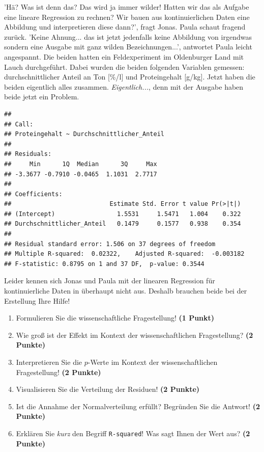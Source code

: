 \documentclass[a4paper, 9pt]{scrartcl}\usepackage[]{graphicx}\usepackage[]{xcolor}
\makeatletter
\newenvironment{kframe}{%
 \def\at@end@of@kframe{}%
 \ifinner\ifhmode%
  \def\at@end@of@kframe{\end{minipage}}%
  \begin{minipage}{\columnwidth}%
 \fi\fi%
 \def\FrameCommand##1{\hskip\@totalleftmargin \hskip-\fboxsep
 \colorbox{shadecolor}{##1}\hskip-\fboxsep
     \hskip-\linewidth \hskip-\@totalleftmargin \hskip\columnwidth}%
 \MakeFramed {\advance\hsize-\width
   \@totalleftmargin\z@ \linewidth\hsize
   \@setminipage}}%
 {\par\unskip\endMakeFramed%
 \at@end@of@kframe}
\newenvironment{knitrout}{}{} %
\makeatother
\begin{document}
'Hä? Was ist denn das? Das wird ja immer wilder! Hatten wir das als Aufgabe eine lineare Regression zu rechnen? Wir bauen aus kontinuierlichen Daten eine Abbildung und interpretieren diese dann?', fragt Jonas. Paula schaut fragend zurück. 'Keine Ahnung... das ist jetzt jedenfalls keine Abbildung von irgendwas sondern eine \Rlogo Ausgabe mit ganz wilden Bezeichnungen...', antwortet Paula leicht angespannt. Die beiden hatten ein Feldexperiment im Oldenburger Land mit Lauch durchgeführt. Dabei wurden die beiden folgenden Variablen gemessen: durchschnittlicher Anteil an Ton [\%/l] und Proteingehalt [g/kg]. Jetzt haben die beiden eigentlich alles zusammen. \textit{Eigentlich...}, denn mit der \Rlogo Ausgabe haben beide jetzt ein Problem.

\begin{knitrout}
\color{fgcolor}\begin{kframe}
\begin{verbatim}
## 
## Call:
## Proteingehalt ~ Durchschnittlicher_Anteil
## 
## Residuals:
##     Min      1Q  Median      3Q     Max 
## -3.3677 -0.7910 -0.0465  1.1031  2.7717 
## 
## Coefficients:
##                           Estimate Std. Error t value Pr(>|t|)
## (Intercept)                 1.5531     1.5471   1.004    0.322
## Durchschnittlicher_Anteil   0.1479     0.1577   0.938    0.354
## 
## Residual standard error: 1.506 on 37 degrees of freedom
## Multiple R-squared:  0.02322,	Adjusted R-squared:  -0.003182 
## F-statistic: 0.8795 on 1 and 37 DF,  p-value: 0.3544
\end{verbatim}
\end{kframe}
\end{knitrout}

Leider kennen sich Jonas und Paula mit der linearen Regression für kontinuierliche Daten in \Rlogo überhaupt nicht aus. Deshalb brauchen beide bei der Erstellung Ihre Hilfe!


\begin{enumerate}
\item Formulieren Sie die wissenschaftliche Fragestellung! \textbf{(1 Punkt)}
\item Wie groß ist der Effekt im Kontext der wissenschaftlichen Fragestellung? \textbf{(2 Punkte)} 
\item Interpretieren Sie die $p$-Werte im Kontext der wissenschaftlichen Fragestellung! \textbf{(2 Punkte)}
\item Visualisieren Sie die Verteilung der Residuen! \textbf{(2 Punkte)} 
\item Ist die Annahme der Normalverteilung erfüllt? Begründen Sie die Antwort! \textbf{(2 Punkte)}
\item Erklären Sie \textit{kurz} den Begriff \texttt{R-squared}! Was sagt Ihnen der Wert aus? \textbf{(2 Punkte)}
\end{enumerate}
 
\end{document}

